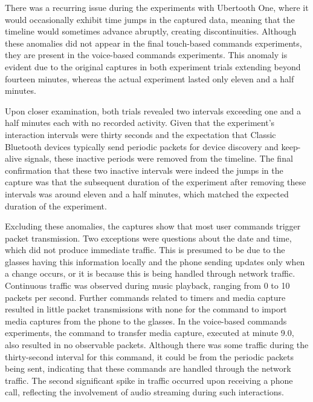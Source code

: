 There was a recurring issue during the experiments with Ubertooth One, where it would occasionally exhibit time jumps in the captured data, meaning that the timeline would sometimes advance abruptly, creating discontinuities. Although these anomalies did not appear in the final touch-based commands experiments, they are present in the voice-based commands experiments. This anomaly is evident due to the original captures in both experiment trials extending beyond fourteen minutes, whereas the actual experiment lasted only eleven and a half minutes. 

Upon closer examination, both trials revealed two intervals exceeding one and a half minutes each with no recorded activity. Given that the experiment's interaction intervals were thirty seconds and the expectation that Classic Bluetooth devices typically send periodic packets for device discovery and keep-alive signals, these inactive periods were removed from the timeline. The final confirmation that these two inactive intervals were indeed the jumps in the capture was that the subsequent duration of the experiment after removing these intervals was around eleven and a half minutes, which matched the expected duration of the experiment.

Excluding these anomalies, the captures show that most user commands trigger packet transmission. Two exceptions were questions about the date and time, which did not produce immediate traffic. This is presumed to be due to the glasses having this information locally and the phone sending updates only when a change occurs, or it is because this is being handled through network traffic. Continuous traffic was observed during music playback, ranging from 0 to 10 packets per second. Further commands related to timers and media capture resulted in little packet transmissions with none for the command to import media captures from the phone to the glasses. In the voice-based commands experiments, the command to transfer media capture, executed at minute 9.0, also resulted in no observable packets. Although there was some traffic during the thirty-second interval for this command, it could be from the periodic packets being sent, indicating that these commands are handled through the network traffic. The second significant spike in traffic occurred upon receiving a phone call, reflecting the involvement of audio streaming during such interactions. 

